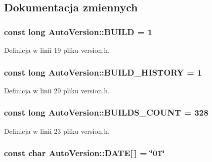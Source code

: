 \subsection{Dokumentacja zmiennych}
\hypertarget{a00019_611dbb96b2f949b29627d8d714396911}{
\subsubsection[{BUILD}]{\setlength{\rightskip}{0pt plus 5cm}const long {\bf AutoVersion::BUILD} = 1}}
\label{dd/da2/a00019_611dbb96b2f949b29627d8d714396911}




Definicja w linii 19 pliku version.h.\hypertarget{a00019_cc483b25abe55f62bcf02496baf549dc}{
\subsubsection[{BUILD\_\-HISTORY}]{\setlength{\rightskip}{0pt plus 5cm}const long {\bf AutoVersion::BUILD\_\-HISTORY} = 1}}
\label{dd/da2/a00019_cc483b25abe55f62bcf02496baf549dc}




Definicja w linii 29 pliku version.h.\hypertarget{a00019_03e819549a8f22b45aacef6ac27de284}{
\subsubsection[{BUILDS\_\-COUNT}]{\setlength{\rightskip}{0pt plus 5cm}const long {\bf AutoVersion::BUILDS\_\-COUNT} = 328}}
\label{dd/da2/a00019_03e819549a8f22b45aacef6ac27de284}




Definicja w linii 23 pliku version.h.\hypertarget{a00019_76114a4076f4ae162ea5de4f97d1a597}{
\subsubsection[{DATE}]{\setlength{\rightskip}{0pt plus 5cm}const char {\bf AutoVersion::DATE}\mbox{[}$\,$\mbox{]} = \char`\"{}01\char`\"{}}}
\label{dd/da2/a00019_76114a4076f4ae162ea5de4f97d1a597}




